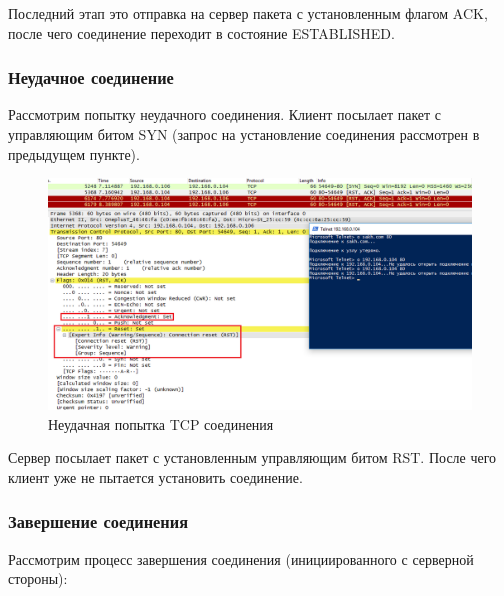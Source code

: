 \documentclass[14pt,a4paper,report]{report}
\begin{document}
Последний этап это отправка на сервер пакета с установленным флагом ACK, после чего соединение переходит в состояние ESTABLISHED.

\subsubsection{Неудачное соединение}

Рассмотрим попытку неудачного соединения. Клиент посылает пакет с управляющим битом SYN (запрос на установление соединения рассмотрен в предыдущем пункте).

\begin{figure}[h!]
	\centering
	\includegraphics[scale = 0.60]{images/tcp4.png}
	
	\caption{Неудачная попытка TCP соединения}
	\label{image:18}
\end{figure}

Сервер посылает пакет с установленным управляющим битом RST. После чего клиент уже не пытается установить соединение.

\subsubsection{Завершение соединения}

Рассмотрим процесс завершения соединения (инициированного с серверной стороны):
\end{document}
